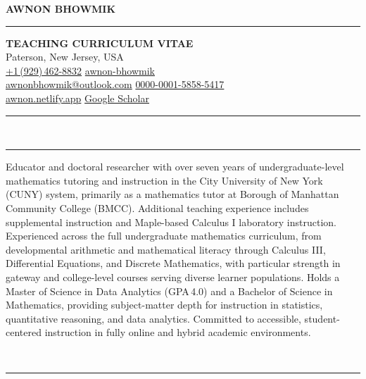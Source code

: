 \documentclass[a4paper, 11pt]{article}
\newcommand{\cvsection}[2]{%
  \vspace{14pt}%
  \noindent#1\enspace{\large\bfseries\MakeUppercase{#2}}\\[-3pt]%
  \rule{\linewidth}{1pt}%
  \vspace{5pt}\par\noindent%
}
\begin{document}

\begin{flushleft}
  {\Large\bfseries AWNON BHOWMIK}
\end{flushleft}

\begin{flushleft}
\rule{\textwidth}{1pt}
{\large\bfseries TEACHING CURRICULUM VITAE}\\[6pt]
\faMapMarker*\enspace Paterson, New Jersey, USA\\[4pt]
\faPhone*\enspace\href{tel:+19294628832}{+1\,(929)\,462-8832}
\hfill
\faLinkedin\enspace\href{https://www.linkedin.com/in/awnon-bhowmik}{awnon-bhowmik}\\[2pt]
\faEnvelope\enspace\href{mailto:awnonbhowmik@outlook.com}{awnonbhowmik@outlook.com}
\hfill
\faOrcid\enspace\href{https://orcid.org/0000-0001-5858-5417}{0000-0001-5858-5417}\\[2pt]
\faGlobe\enspace\href{https://awnon.netlify.app}{awnon.netlify.app}
\hfill
\faSearch\enspace\href{https://scholar.google.com/citations?user=nEdZAFkAAAAJ}{Google Scholar}\\[2pt]
\rule{\textwidth}{1pt}
\end{flushleft}

\cvsection{\faUser}{Teaching Profile}

Educator and doctoral researcher with over seven years of undergraduate-level mathematics
tutoring and instruction in the City University of New York (CUNY) system, primarily as a
mathematics tutor at Borough of Manhattan Community College (BMCC). Additional teaching
experience includes supplemental instruction and Maple-based Calculus I laboratory instruction.
Experienced across the full undergraduate mathematics
curriculum, from developmental arithmetic and mathematical literacy through Calculus III,
Differential Equations, and Discrete Mathematics, with particular strength in gateway and
college-level courses serving diverse learner populations. Holds a Master of Science in Data
Analytics (GPA\,4.0) and a Bachelor of Science in Mathematics, providing subject-matter depth
for instruction in statistics, quantitative reasoning, and data analytics. Committed to
accessible, student-centered instruction in fully online and hybrid academic environments.

\cvsection{\faChalkboard}{Teaching Areas}
\end{document}

